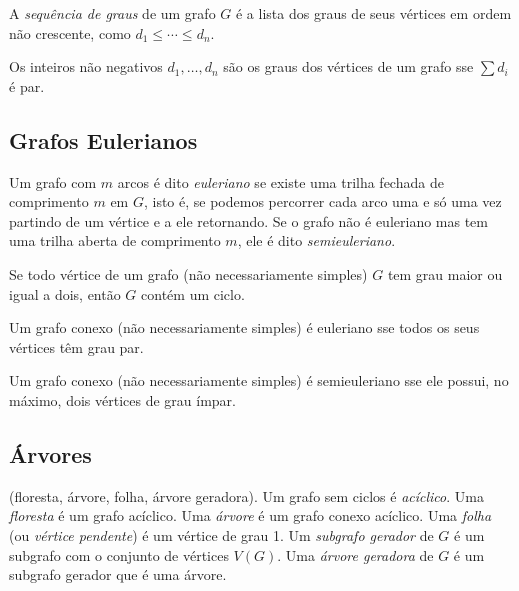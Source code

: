 \documentclass{article}
\begin{document}
\begin{defn}
    A \emph{sequência de graus} de um grafo \(G\) é a lista dos graus de seus vértices em ordem não crescente, como \(d_1 \leq \cdots \leq d_n\).
\end{defn}

\begin{prop}
    Os inteiros não negativos \(d_1, \ldots, d_n\) são os graus dos vértices de um grafo sse \(\sum d_i\) é par.
\end{prop}

\subsection{Grafos Eulerianos}

\begin{defn}
    Um grafo com \(m\) arcos é dito \emph{euleriano} se existe uma trilha fechada de comprimento \(m\) em \(G\), isto é, se podemos percorrer cada arco uma e só uma vez partindo de um vértice e a ele retornando.
    Se o grafo não é euleriano mas tem uma trilha aberta de comprimento \(m\), ele é dito \emph{semieuleriano}.
\end{defn}

\begin{lem}
    Se todo vértice de um grafo (não necessariamente simples) \(G\) tem grau maior ou igual a dois, então \(G\) contém um ciclo.
\end{lem}

\begin{thm} [Euler]
    Um grafo conexo (não necessariamente simples) é euleriano sse todos os seus vértices têm grau par.
\end{thm}

\begin{cor}
    Um grafo conexo (não necessariamente simples) é semieuleriano sse ele possui, no máximo, dois vértices de grau ímpar.
\end{cor}

\subsection{Árvores}

\begin{defn} (floresta, árvore, folha, árvore geradora).
    Um grafo sem ciclos é \emph{acíclico}. Uma \emph{floresta} é um grafo acíclico. Uma \emph{árvore} é um grafo conexo acíclico. Uma \emph{folha} (ou \emph{vértice pendente}) é um vértice de grau 1. Um \emph{subgrafo gerador} de \(G\) é um subgrafo com o conjunto de vértices \(V(G)\). Uma \emph{árvore geradora} de \(G\) é um subgrafo gerador que é uma árvore.
\end{defn}
\end{document}
